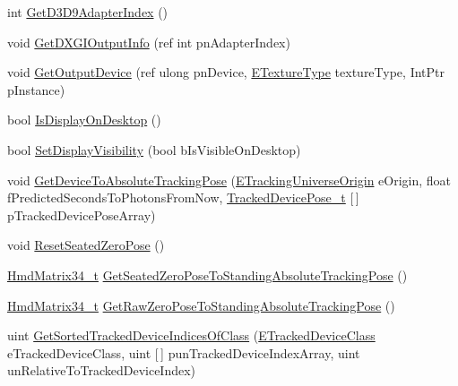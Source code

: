 \begin{DoxyCompactItemize}
int \mbox{\hyperlink{class_valve_1_1_v_r_1_1_c_v_r_system_a7afe0eda4e65687842208f8ce905a64e}{Get\+D3\+D9\+Adapter\+Index}} ()
\item 
void \mbox{\hyperlink{class_valve_1_1_v_r_1_1_c_v_r_system_a04a43b098747d72d59534db48ce7c293}{Get\+D\+X\+G\+I\+Output\+Info}} (ref int pn\+Adapter\+Index)
\item 
void \mbox{\hyperlink{class_valve_1_1_v_r_1_1_c_v_r_system_a385592a6afe1b4695151161044f49e99}{Get\+Output\+Device}} (ref ulong pn\+Device, \mbox{\hyperlink{namespace_valve_1_1_v_r_a9481de640e411eef49c2f3fdca82eaa3}{E\+Texture\+Type}} texture\+Type, Int\+Ptr p\+Instance)
\item 
bool \mbox{\hyperlink{class_valve_1_1_v_r_1_1_c_v_r_system_a9c4ab5e7989d6c1938159b7a1ec42b14}{Is\+Display\+On\+Desktop}} ()
\item 
bool \mbox{\hyperlink{class_valve_1_1_v_r_1_1_c_v_r_system_a4ade672a06d9ebb00320f2cc04314b52}{Set\+Display\+Visibility}} (bool b\+Is\+Visible\+On\+Desktop)
\item 
void \mbox{\hyperlink{class_valve_1_1_v_r_1_1_c_v_r_system_abb17d53b9f9ac2fbb29cde9e0805826e}{Get\+Device\+To\+Absolute\+Tracking\+Pose}} (\mbox{\hyperlink{namespace_valve_1_1_v_r_a29be99a3c2f780157bd490db06a7f12f}{E\+Tracking\+Universe\+Origin}} e\+Origin, float f\+Predicted\+Seconds\+To\+Photons\+From\+Now, \mbox{\hyperlink{struct_valve_1_1_v_r_1_1_tracked_device_pose__t}{Tracked\+Device\+Pose\+\_\+t}} \mbox{[}$\,$\mbox{]} p\+Tracked\+Device\+Pose\+Array)
\item 
void \mbox{\hyperlink{class_valve_1_1_v_r_1_1_c_v_r_system_af904b763d37e3fd62655183a9d2756ee}{Reset\+Seated\+Zero\+Pose}} ()
\item 
\mbox{\hyperlink{struct_valve_1_1_v_r_1_1_hmd_matrix34__t}{Hmd\+Matrix34\+\_\+t}} \mbox{\hyperlink{class_valve_1_1_v_r_1_1_c_v_r_system_a117026af270ea0f9c11538c5e442b102}{Get\+Seated\+Zero\+Pose\+To\+Standing\+Absolute\+Tracking\+Pose}} ()
\item 
\mbox{\hyperlink{struct_valve_1_1_v_r_1_1_hmd_matrix34__t}{Hmd\+Matrix34\+\_\+t}} \mbox{\hyperlink{class_valve_1_1_v_r_1_1_c_v_r_system_a018442755324a3f6a307f387678c2f72}{Get\+Raw\+Zero\+Pose\+To\+Standing\+Absolute\+Tracking\+Pose}} ()
\item 
uint \mbox{\hyperlink{class_valve_1_1_v_r_1_1_c_v_r_system_a52663d4f2298d80ebbb9e7a81df46dff}{Get\+Sorted\+Tracked\+Device\+Indices\+Of\+Class}} (\mbox{\hyperlink{namespace_valve_1_1_v_r_aa1a3c2765fe53acb85372a57652c47a1}{E\+Tracked\+Device\+Class}} e\+Tracked\+Device\+Class, uint \mbox{[}$\,$\mbox{]} pun\+Tracked\+Device\+Index\+Array, uint un\+Relative\+To\+Tracked\+Device\+Index)

\end{DoxyCompactItemize}
